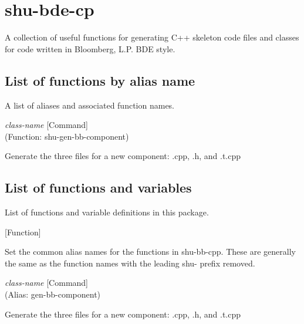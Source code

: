 \section{shu-bde-cp}


A collection of useful functions for generating C++ skeleton code files
and classes for code written in Bloomberg, L.P. BDE style.


\subsection{List of functions by alias name}

A list of aliases and associated function names.



\vspace{1em}
\noindent
{}
\usebox{\funcname}\emph{class-name}
 \hfill [Command]\\%
 (Function: shu-gen-bb-component)

\begin{doc-string}
Generate the three files for a new component: .cpp, .h, and .t.cpp
\end{doc-string}

\subsection{List of functions and variables}

List of functions and variable definitions in this package.



\vspace{1em}
\noindent
{}
\usebox{\funcname}
 \hfill [Function]

\begin{doc-string}
Set the common alias names for the functions in shu-bb-cpp.
These are generally the same as the function names with the leading
shu- prefix removed.
\end{doc-string}

\vspace{1em}
\noindent
{}
\usebox{\funcname}\emph{class-name}
 \hfill [Command]\\%
 (Alias: gen-bb-component)

\begin{doc-string}
Generate the three files for a new component: .cpp, .h, and .t.cpp
\end{doc-string}

